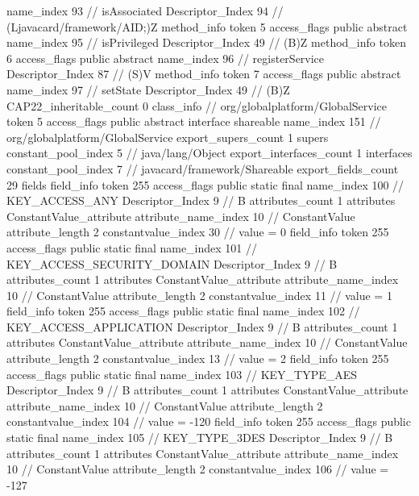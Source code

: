 {{{{{					name_index	93		// isAssociated
					Descriptor_Index	94		// (Ljavacard/framework/AID;)Z
				}
				method_info {
					token	5
					access_flags	public abstract
					name_index	95		// isPrivileged
					Descriptor_Index	49		// (B)Z
				}
				method_info {
					token	6
					access_flags	public abstract
					name_index	96		// registerService
					Descriptor_Index	87		// (S)V
				}
				method_info {
					token	7
					access_flags	public abstract
					name_index	97		// setState
					Descriptor_Index	49		// (B)Z
				}
			}
			CAP22_inheritable_count	0
		}
		class_info {		// org/globalplatform/GlobalService
			token	5
			access_flags	public abstract interface shareable
			name_index	151		// org/globalplatform/GlobalService
			export_supers_count	1
			supers {
				constant_pool_index	5		// java/lang/Object
			}
			export_interfaces_count	1
			interfaces {
				constant_pool_index	7		// javacard/framework/Shareable
			}
			export_fields_count	29
			fields {
			field_info {
				token	255
				access_flags	public static final
				name_index	100		// KEY_ACCESS_ANY
				Descriptor_Index	9		// B
				attributes_count	1
				attributes {
				ConstantValue_attribute {
					attribute_name_index	10		// ConstantValue
					attribute_length	2
					constantvalue_index	30		// value = 0
				}
				}
			}
			field_info {
				token	255
				access_flags	public static final
				name_index	101		// KEY_ACCESS_SECURITY_DOMAIN
				Descriptor_Index	9		// B
				attributes_count	1
				attributes {
				ConstantValue_attribute {
					attribute_name_index	10		// ConstantValue
					attribute_length	2
					constantvalue_index	11		// value = 1
				}
				}
			}
			field_info {
				token	255
				access_flags	public static final
				name_index	102		// KEY_ACCESS_APPLICATION
				Descriptor_Index	9		// B
				attributes_count	1
				attributes {
				ConstantValue_attribute {
					attribute_name_index	10		// ConstantValue
					attribute_length	2
					constantvalue_index	13		// value = 2
				}
				}
			}
			field_info {
				token	255
				access_flags	public static final
				name_index	103		// KEY_TYPE_AES
				Descriptor_Index	9		// B
				attributes_count	1
				attributes {
				ConstantValue_attribute {
					attribute_name_index	10		// ConstantValue
					attribute_length	2
					constantvalue_index	104		// value = -120
				}
				}
			}
			field_info {
				token	255
				access_flags	public static final
				name_index	105		// KEY_TYPE_3DES
				Descriptor_Index	9		// B
				attributes_count	1
				attributes {
				ConstantValue_attribute {
					attribute_name_index	10		// ConstantValue
					attribute_length	2
					constantvalue_index	106		// value = -127
}}}}}}}
